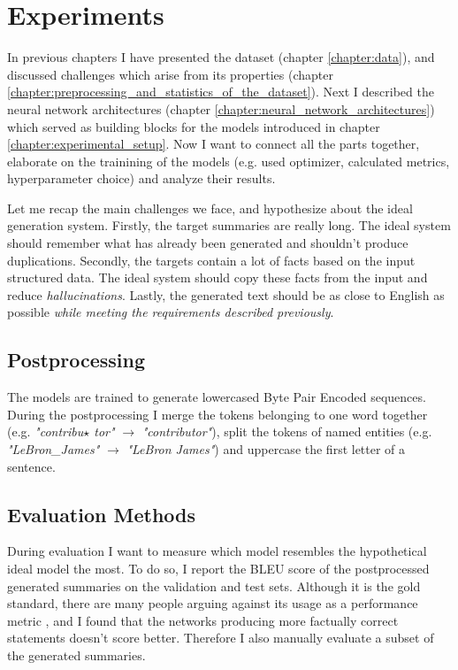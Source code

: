 \chapter{Experiments} \label{chapter:experiments}

In previous chapters I have presented the dataset (chapter \ref{chapter:data}), and discussed challenges which arise from its properties (chapter \ref{chapter:preprocessing_and_statistics_of_the_dataset}). Next I described the neural network architectures (chapter \ref{chapter:neural_network_architectures}) which served as building blocks for the models introduced in chapter \ref{chapter:experimental_setup}. Now I want to connect all the parts together, elaborate on the trainining of the models (e.g. used optimizer, calculated metrics, hyperparameter choice) and analyze their results.

Let me recap the main challenges we face, and hypothesize about the ideal generation system. Firstly, the target summaries are really long. The ideal system should remember what has already been generated and shouldn't produce duplications. Secondly, the targets contain a lot of facts based on the input structured data. The ideal system should copy these facts from the input and reduce \emph{hallucinations}. Lastly, the generated text should be as close to English as possible \emph{while meeting the requirements described previously}.

\section{Postprocessing}

The models are trained to generate lowercased Byte Pair Encoded sequences. During the postprocessing I merge the tokens belonging to one word together (e.g. \emph{"contribu$\star$ tor"} $\rightarrow$ \emph{"contributor"}), split the tokens of named entities (e.g. \emph{"LeBron\_James"} $\rightarrow$ \emph{"LeBron James"}) and uppercase the first letter of a sentence.

\section{Evaluation Methods}

During evaluation I want to measure which model resembles the hypothetical ideal model the most. To do so, I report the BLEU score \citep{papineni2002} of the postprocessed generated summaries on the validation and test sets. Although it is the gold standard, there are many people arguing against its usage as a performance metric \citep{celikyilmaz2021evaluation}, and I found that the networks producing more factually correct statements doesn't score better. Therefore I also manually evaluate a subset of the generated summaries.


